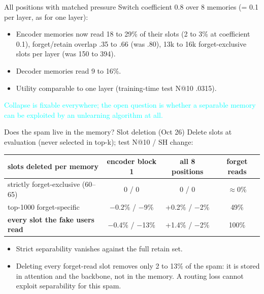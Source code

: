 \documentclass{beamer}
\newcommand{\pierre}[1]{\textcolor{cyan}{#1}}
\begin{document}
\begin{frame}{All positions with matched pressure}
Switch coefficient 0.8 over 8 memories (= 0.1 per layer, as for one layer):
\begin{itemize}
  \item Encoder memories now read 18 to 29\% of their slots (2 to 3\% at
        coefficient 0.1), forget/retain overlap .35 to .66 (was .80), 13k to 16k
        forget-exclusive slots per layer (was 150 to 394).
  \item Decoder memories read 9 to 16\%.
  \item Utility comparable to one layer (training-time test N@10 .0315).
\end{itemize}
\medskip
\pierre{Collapse is fixable everywhere; the open question is whether a
separable memory can be exploited by an unlearning algorithm at all.}
\end{frame}

\begin{frame}{Does the spam live in the memory? Slot deletion (Oct 26)}
Delete slots at evaluation (never selected in top-k); test N@10 / SH change:
\begin{center}
\footnotesize\setlength{\tabcolsep}{3pt}
\begin{tabular}{|l|c|c|c|}
\hline
slots deleted per memory & encoder block 1 & all 8 positions & forget reads \\
\hline
strictly forget-exclusive (60--65) & 0 / 0 & 0 / 0 & $\approx$0\% \\
top-1000 forget-specific & $-$0.2\% / $-$9\% & +0.2\% / $-$2\% & 49\% \\
\textbf{every slot the fake users read} & $-$0.4\% / $-$13\% & +1.4\% / $-$2\% & 100\% \\
\hline
\end{tabular}
\end{center}
\begin{itemize}
  \item Strict separability vanishes against the full retain set.
  \item Deleting every forget-read slot removes only 2 to 13\% of the spam: it is
        stored in attention and the backbone, not in the memory. A routing loss
        cannot exploit separability for this spam.
\end{itemize}
\end{frame}
\end{document}
